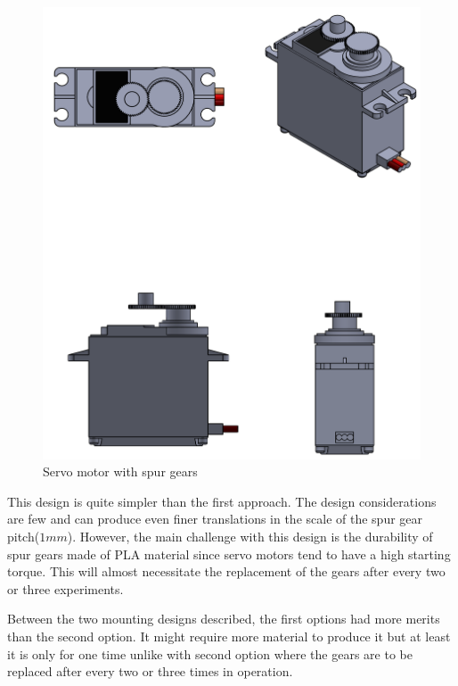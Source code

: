 \begin{enumerate}
\begin{enumerate}
\begin{enumerate}
\begin{itemize}
\begin{figure}[H]
                  \includegraphics[height=.55\textheight]{Figures/ServoMotorWithSpurGears.PNG}
                  \caption{Servo motor with spur gears}
                  \label{fig:servo_motor_with_spur_gears}
              \end{figure}
              This design is quite simpler than the first approach. The design considerations are few and can produce even finer translations in the scale of the spur gear pitch($1 mm$). However, the main challenge with this design is the durability of spur gears made of PLA material since servo motors tend to have a high starting torque. This will almost necessitate the replacement of the gears after every two or three experiments.  
          \end{itemize}
     \end{enumerate}
     \par
     Between the two mounting designs described, the first options had more merits than the second option. It might require more material to produce it but at least it is only for one time unlike with second option where the gears are to be replaced after every two or three times in operation.

\end{enumerate}
\end{enumerate}
